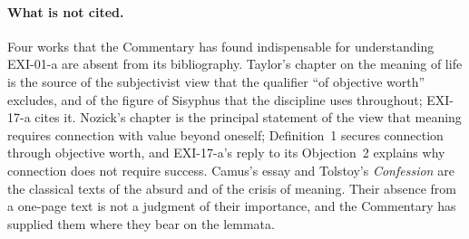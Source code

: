 \paragraph{What is not cited.} Four works that the Commentary has found indispensable for understanding EXI-01-a are absent from its bibliography. Taylor's chapter on the meaning of life \citep[ch.~18]{Taylor1970} is the source of the subjectivist view that the qualifier \enquote{of objective worth} excludes, and of the figure of Sisyphus that the discipline uses throughout; EXI-17-a cites it. Nozick's chapter \citep[ch.~6]{Nozick1981} is the principal statement of the view that meaning requires connection with value beyond oneself; Definition~1 secures connection through objective worth, and EXI-17-a's reply to its Objection~2 explains why connection does not require success. Camus's essay \citep{Camus1955} and Tolstoy's \emph{Confession} \citep{Tolstoy1987} are the classical texts of the absurd and of the crisis of meaning. Their absence from a one-page text is not a judgment of their importance, and the Commentary has supplied them where they bear on the lemmata.
